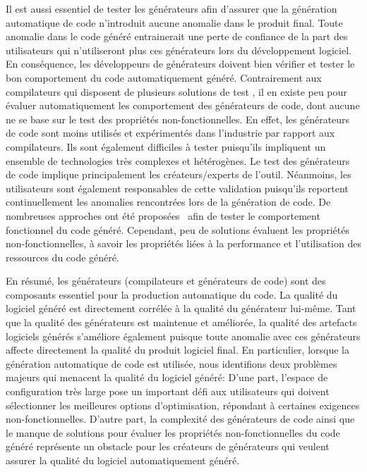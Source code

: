 Il est aussi essentiel de tester les g\'en\'erateurs afin d'assurer que la g\'en\'eration automatique de code n'introduit aucune anomalie dans le produit final. Toute anomalie dans le code g\'en\'er\'e entrainerait une perte de confiance de la part des utilisateurs qui n'utiliseront plus ces g\'en\'erateurs lors du d\'eveloppement logiciel. En cons\'equence, les d\'eveloppeurs de g\'en\'erateurs doivent bien v\'erifier et tester le bon comportement  du code automatiquement g\'en\'er\'e.
Contrairement aux compilateurs qui disposent de plusieurs solutions de test \cite{yang2011finding, le2014compiler}, il en existe peu pour \'evaluer automatiquement les comportement des g\'en\'erateurs de code, dont aucune ne se base sur le test des propri\'et\'es non-fonctionnelles. 
En effet, les g\'en\'erateurs de code sont moins utilis\'es et exp\'eriment\'es dans l'industrie par rapport aux compilateurs. Ils sont \'egalement difficiles \`a tester puisqu'ils impliquent un ensemble de technologies tr\`es complexes et h\'et\'erog\`enes\cite{guana2015developers, guana2014chaintracker}.
Le test des g\'en\'erateurs de code implique principalement les cr\'eateurs/experts de l'outil. N\'eanmoins, les utilisateurs sont \'egalement responsables de cette validation puisqu'ils reportent continuellement les anomalies rencontr\'ees lors de la g\'en\'eration de code.
De nombreuses approches ont \'et\'e propos\'ees~\cite{stuermer2007systematic, yang2011finding} afin de tester le comportement fonctionnel du code g\'en\'er\'e. Cependant, peu de solutions \'evaluent les propri\'et\'es non-fonctionnelles, \`a savoir les propri\'et\'es li\'ees \`a la performance et l'utilisation des ressources du code g\'en\'er\'e.

En r\'esum\'e, les g\'en\'erateurs (compilateurs et g\'en\'erateurs de code) sont des composants essentiel pour la production automatique du code. La qualit\'e du logiciel g\'en\'er\'e est directement corr\'el\'ee \`a la qualit\'e du g\'en\'erateur lui-m\^eme. Tant que la qualit\'e des g\'en\'erateurs est maintenue et am\'elior\'ee, la qualit\'e des artefacts logiciels g\'en\'er\'es s'am\'eliore \'egalement puisque toute anomalie avec ces g\'en\'erateurs affecte directement la qualit\'e du produit logiciel final.
En particulier, lorsque la g\'en\'eration automatique de code est utilis\'ee, nous identifions deux probl\`emes majeurs qui menacent la qualit\'e du logiciel g\'en\'er\'e:
D'une part, l'espace de configuration tr\`es large pose un important d\'efi aux utilisateurs qui doivent s\'electionner les meilleures options d'optimisation, r\'epondant \`a certaines exigences non-fonctionnelles.
D'autre part, la complexit\'e des g\'en\'erateurs de code ainsi que le manque de solutions pour \'evaluer les propri\'et\'es non-fonctionnelles du code g\'en\'er\'e repr\'esente un obstacle pour les cr\'eateurs de g\'en\'erateurs qui veulent assurer la qualit\'e du logiciel automatiquement g\'en\'er\'e.


